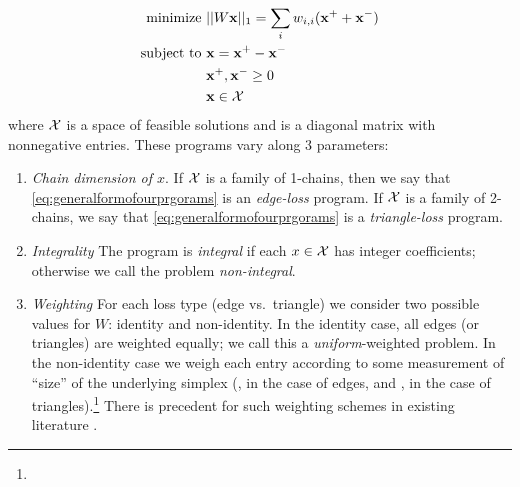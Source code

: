 \begin{align}
\begin{split}
    \text{minimize } & || W \mathbf{x}||_1 = \sum_i w_{i,i} (\mathbf{x}^+ + \mathbf{x}^-) \\
    \text{subject to } 
    & \mathbf{x} = \mathbf{x}^+ - \mathbf{x}^- \\
    & \mathbf{x}^+, \mathbf{x}^- \ge 0 \\
    & \mathbf{x} \in \mathcal{X}
\end{split}
\label{eq:generalformofourprgorams}
\end{align}
where $\mathcal{X}$ is a space of feasible solutions and \DIFdelbegin {}\DIFdelend \DIFaddbegin {}\DIFaddend is a diagonal matrix with nonnegative entries.  These programs vary along 3 parameters:
    \begin{enumerate}
        \item \emph{Chain dimension of $x$}.  If $\mathcal{X}$ is a family of 1-chains, then we say that \eqref{eq:generalformofourprgorams} is an \emph{edge-loss} program.  If $\mathcal{X}$ is a family of 2-chains, we say that \eqref{eq:generalformofourprgorams} is a \emph{triangle-loss} program.

        \item \emph{Integrality}  The program is \emph{integral} if each $x \in \mathcal{X}$ has integer coefficients; otherwise we call the problem \emph{non-integral}.

        \item \emph{Weighting}  For each loss type (edge vs.\ triangle) we consider two possible values for $W$: identity and non-identity.  In the identity case, all edges (or triangles) are weighted equally; we call this a \emph{uniform}-weighted problem.  In the non-identity case we weigh each entry according to some measurement of ``size'' of the underlying simplex (\DIFdelbegin {}\DIFdelend \DIFaddbegin \emph{}\DIFaddend , in the case of edges, and \DIFdelbegin {}\DIFdelend \DIFaddbegin \emph{}\DIFaddend , in the case of triangles).\DIFaddbegin \footnote{}  \DIFaddend There is precedent for such weighting schemes in existing literature \cite{dey2011optimal, chenquantifying}.
    \end{enumerate}


